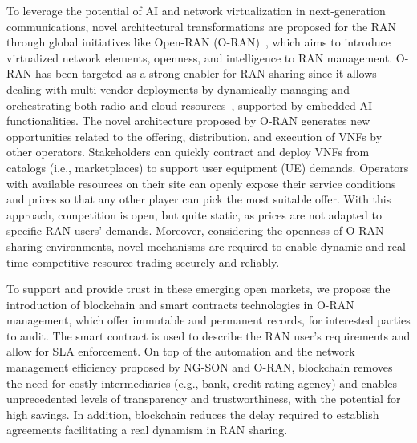 \documentclass[journal]{IEEEtran}
\begin{document}
	To leverage the potential of AI and network virtualization in next-generation communications, novel architectural transformations are proposed for the RAN through global initiatives like Open-RAN (O-RAN)~\cite{ORANall}, which aims to introduce virtualized network elements, openness, and intelligence to RAN management. O-RAN has been targeted as a strong enabler for RAN sharing since it allows dealing with multi-vendor deployments by dynamically managing and orchestrating both radio and cloud resources~\cite{ORANall}, supported by embedded AI functionalities.
	The novel architecture proposed by O-RAN generates new opportunities related to the offering, distribution, and execution of VNFs by other operators. Stakeholders can quickly contract and deploy VNFs from catalogs (i.e., marketplaces) to support user equipment (UE) demands. Operators with available resources on their site can openly expose their service conditions and prices so that any other player can pick the most suitable offer. With this approach, competition is open, but quite static, as prices are not adapted to specific RAN users' demands. Moreover, considering the openness of O-RAN sharing environments, novel mechanisms are required to enable dynamic and real-time competitive resource trading securely and reliably.%
	
	To support and provide trust in these emerging open markets, we propose the introduction of blockchain and smart contracts technologies in O-RAN management, which offer immutable and permanent records, for interested parties to audit. The smart contract is used to describe the RAN user's requirements and allow for SLA enforcement. On top of the automation and the network management efficiency proposed by NG-SON and O-RAN, blockchain removes the need for costly intermediaries (e.g., bank, credit rating agency) and enables unprecedented levels of transparency and trustworthiness, with the potential for high savings. In addition, blockchain reduces the delay required to establish agreements facilitating a real dynamism in RAN sharing.
\end{document}
